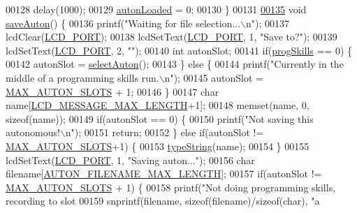 \begin{DoxyCode}
{{{{{{00128     delay(1000);
00129     \hyperlink{autonrecorder_8c_a4e72d907ee74449b71b5e20943f4217e}{autonLoaded} = 0;
00130 \}
00131 
\hypertarget{autonrecorder_8c_source.tex_l00135}{}\hyperlink{autonrecorder_8h_ae6b758086a3b984c6705e12859eed2cc}{00135} \textcolor{keywordtype}{void} \hyperlink{autonrecorder_8c_ae6b758086a3b984c6705e12859eed2cc}{saveAuton}() \{
00136     printf(\textcolor{stringliteral}{"Waiting for file selection...\(\backslash\)n"});
00137     lcdClear(\hyperlink{lcdmsg_8h_abcf42bd88b3c36193f301ca25b033875}{LCD\_PORT});
00138     lcdSetText(\hyperlink{lcdmsg_8h_abcf42bd88b3c36193f301ca25b033875}{LCD\_PORT}, 1, \textcolor{stringliteral}{"Save to?"});
00139     lcdSetText(\hyperlink{lcdmsg_8h_abcf42bd88b3c36193f301ca25b033875}{LCD\_PORT}, 2, \textcolor{stringliteral}{""});
00140     \textcolor{keywordtype}{int} autonSlot;
00141     \textcolor{keywordflow}{if}(\hyperlink{autonrecorder_8c_aa2eda471576bdbaf33835a71da9bc616}{progSkills} == 0) \{
00142         autonSlot = \hyperlink{autonrecorder_8c_a7233586e332461dc25c7cc950a08d429}{selectAuton}();
00143     \} \textcolor{keywordflow}{else} \{
00144         printf(\textcolor{stringliteral}{"Currently in the middle of a programming skills run.\(\backslash\)n"});
00145         autonSlot = \hyperlink{autonrecorder_8h_a5173a11a545cb4020fdd139552dc15c1}{MAX\_AUTON\_SLOTS} + 1;
00146     \}
00147     \textcolor{keywordtype}{char} name[\hyperlink{lcdmsg_8h_abe4c4b70fc6f44ae3680e5b2c68cdd00}{LCD\_MESSAGE\_MAX\_LENGTH}+1];
00148     memset(name, 0, \textcolor{keyword}{sizeof}(name));
00149     \textcolor{keywordflow}{if}(autonSlot == 0) \{
00150         printf(\textcolor{stringliteral}{"Not saving this autonomous!\(\backslash\)n"});
00151         \textcolor{keywordflow}{return};
00152     \} \textcolor{keywordflow}{else} \textcolor{keywordflow}{if}(autonSlot != \hyperlink{autonrecorder_8h_a5173a11a545cb4020fdd139552dc15c1}{MAX\_AUTON\_SLOTS}+1) \{
00153         \hyperlink{lcddiag_8c_a17fe3ffc769a6d02c5226b3bfb79f28f}{typeString}(name);
00154     \}
00155     lcdSetText(\hyperlink{lcdmsg_8h_abcf42bd88b3c36193f301ca25b033875}{LCD\_PORT}, 1, \textcolor{stringliteral}{"Saving auton..."});
00156     \textcolor{keywordtype}{char} filename[\hyperlink{autonrecorder_8h_a9411d1482daa18dd8221c30db7fc6e4e}{AUTON\_FILENAME\_MAX\_LENGTH}];
00157     \textcolor{keywordflow}{if}(autonSlot != \hyperlink{autonrecorder_8h_a5173a11a545cb4020fdd139552dc15c1}{MAX\_AUTON\_SLOTS} + 1) \{
00158         printf(\textcolor{stringliteral}{"Not doing programming skills, recording to slot %
00159         snprintf(filename, \textcolor{keyword}{sizeof}(filename)/\textcolor{keyword}{sizeof}(\textcolor{keywordtype}{char}), \textcolor{stringliteral}{"a%
}}}}}}}}
\end{DoxyCode}
